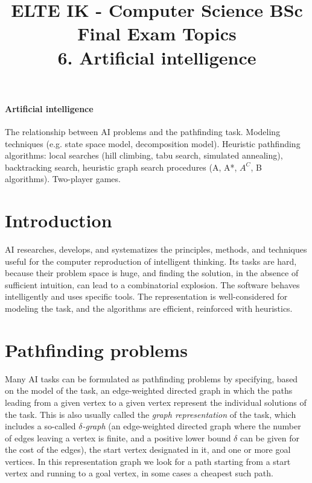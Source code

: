 \documentclass[margin=0px]{article}
\title{\textbf{{\Large ELTE IK - Computer Science BSc} \vspace{0.2cm} \\ {\huge Final Exam Topics}} \vspace{0.3cm} \\ 6. Artificial intelligence}
\author{}
\date{}
\newenvironment{tetel}[1]{\paragraph{#1 \\}}{}
\begin{document}
\maketitle

\begin{center}
\end{center}

\begin{tetel}{Artificial intelligence}
    The relationship between AI problems and the pathfinding task. Modeling techniques (e.g. state space model, decomposition model). Heuristic pathfinding algorithms: local searches (hill climbing, tabu search, simulated annealing), backtracking search, heuristic graph search procedures (A, A*, $A^C$, B algorithms). Two-player games.
\end{tetel}

\section{Introduction}

AI researches, develops, and systematizes the principles, methods, and techniques useful for the computer reproduction of intelligent thinking. Its tasks are hard, because their problem space is huge, and finding the solution, in the absence of sufficient intuition, can lead to a combinatorial explosion. The software behaves intelligently and uses specific tools. The representation is well-considered for modeling the task, and the algorithms are efficient, reinforced with heuristics.

\section{Pathfinding problems}

Many AI tasks can be formulated as pathfinding problems by specifying, based on the model of the task, an edge-weighted directed graph in which the paths leading from a given vertex to a given vertex represent the individual solutions of the task. This is also usually called the \textit{graph representation} of the task, which includes a so-called \textit{$\delta$-graph} (an edge-weighted directed graph where the number of edges leaving a vertex is finite, and a positive lower bound $\delta$ can be given for the cost of the edges), the start vertex designated in it, and one or more goal vertices. In this representation graph we look for a path starting from a start vertex and running to a goal vertex, in some cases a cheapest such path.
\end{document}
